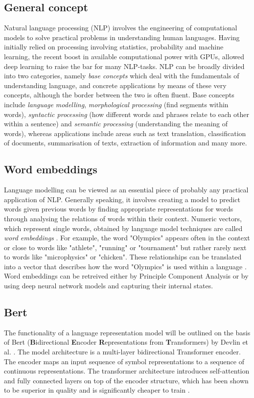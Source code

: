 \subsection{General concept \label{sec:nlp_general_concept}}
Natural language processing (NLP) involves the engineering of computational models to solve practical problems in understanding human languages. Having initially relied on processing involving statistics, probability and machine learning, the recent boost in available computational power with GPUs, allowed deep learning to raise the bar for many NLP-tasks. NLP can be broadly divided into two categories, namely \textit{base concepts} which deal with the fundamentals of understanding language, and concrete applications by means of these very concepts, although the border between the two is often fluent. Base concepts include \textit{language modelling}, \textit{morphological processing} (find segments within words), \textit{syntactic processing} (how different words and phrases relate to each other within a sentence) and \textit{semantic processing} (understanding the meaning of words), whereas applications include areas such as text translation, classification of documents, summarisation of texts, extraction of information and many more.
\subsection{Word embeddings \label{sec:nlp_word_embeddings}}
Language modelling can be viewed as an essential piece of probably any practical application of NLP. Generally speaking, it involves creating a model to predict words given previous words by finding appropriate representations for words through analysing the relations of words within their context. Numeric vectors, which represent single words, obtained by language model techniques are called \textit{word embeddings} \cite{otter2020survey}. For example, the word "Olympics" appears often in the context or close to words like "athlete", "running" or "tournament" but rather rarely next to words like "microphysics" or "chicken". These relationships can be translated into a vector that describes how the word "Olympics" is used within a language \cite{mittechnologyreviewkingqueen}. Word embeddings can be retreived either by Principle Component Analysis or by using deep neural network models and capturing their internal states.
\subsection{Bert \label{Bert}}
The functionality of a language representation model will be outlined on the basis of Bert (\textbf{B}idirectional \textbf{E}ncoder \textbf{R}epresentations from \textbf{T}ransformers) by Devlin et al. \cite{devlin2018bert}. The model architecture is a multi-layer bidirectional Transformer encoder. The encoder maps an input sequence of symbol representations to a sequence of continuous representations. The transformer architecture introduces self-attention and fully connected layers on top of the encoder structure, which has been shown to be superior in quality and is significantly cheaper to train \cite{vaswani2017attention}.

